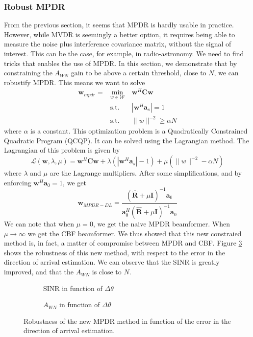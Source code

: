 \documentclass[12pt]{article}
\begin{document}
\subsubsection{Robust MPDR}
From the previous section, it seems that MPDR is hardly usable in practice. However, while MVDR is seemingly a better option, it requires being able to measure the noise plus interference covariance matrix, without the signal of interest. This can be the case, for example, in radio-astronomy. We need to find tricks that enables the use of MPDR. In this section, we demonstrate that by constraining the $A_{WN}$ gain to be above a certain threshold, close to $N$, we can robustify MPDR. This means we want to solve 
$$\begin{aligned}
    \mathbf{w}_{mpdr} =& \min_{w\in\mathcal{W}} &\mathbf{w}^H\mathbf{C}\mathbf{w}\\
    & \textrm{s.t.} \quad &|\mathbf{w}^H\mathbf{a}_s| = 1\\
    & \textrm{s.t.} \quad &\|w\|^{-2} \geq \alpha N
\end{aligned}$$
where $\alpha$ is a constant. This optimization problem is a Quadratically Constrained Quadratic Program (QCQP). It can be solved using the Lagrangian method. The Lagrangian of this problem is given by
\begin{equation}
    \mathcal{L}(\mathbf{w},\lambda,\mu) = \mathbf{w}^H\mathbf{C}\mathbf{w} + \lambda\left(|\mathbf{w}^H\mathbf{a}_s| - 1\right) + \mu\left(\|w\|^{-2} - \alpha N\right)
\end{equation}
where $\lambda$ and $\mu$ are the Lagrange multipliers. After some simplifications, and by enforcing $\mathbf{w}^H\mathbf{a}_0 = 1$, we get
\begin{equation}\label{eq:mpdr_dl}
    \mathbf{w}_{MPDR-DL} = \frac{\left(\hat{\mathbf{R}}+\mu \mathbf{I}\right)^{-1}\mathbf{a}_0}{\mathbf{a}_0^H\left(\hat{\mathbf{R}}+\mu \mathbf{I}\right)^{-1}\mathbf{a}_0}
\end{equation}
We can note that when $\mu = 0$, we get the naive MPDR beamformer. When $\mu\rightarrow\infty$ we get the CBF beamformer. We thus showed that this new constraied method is, in fact, a matter of compromise between MPDR and CBF. Figure \ref{fig:MPDR_robust} shows the robustness of this new method, with respect to the error in the direction of arrival estimation. We can observe that the SINR is greatly improved, and that the $A_{WN}$ is close to $N$.
\begin{figure}[H]
    \centering
    \begin{subfigure}[b]{.4\linewidth}
        
        \caption{SINR in function of $\Delta\theta$}
        \label{fig:MPDR_robust_sinr}
    \end{subfigure}\hspace{0.09\linewidth}
    \begin{subfigure}[b]{.4\linewidth}
        
        \caption{$A_{WN}$ in function of $\Delta\theta$}
        \label{fig:MPDR_robust_awn}
    \end{subfigure}
    \caption{Robustness of the new MPDR method in function of the error in the direction of arrival estimation.}
    \label{fig:MPDR_robust}
\end{figure}
\end{document}
